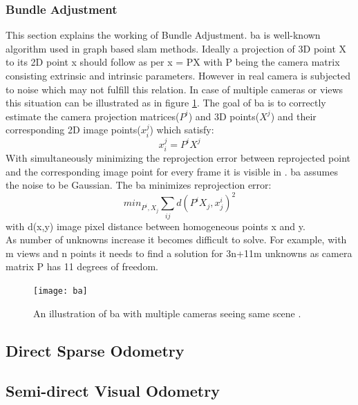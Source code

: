 \subsubsection{Bundle Adjustment}
This section explains the working of Bundle Adjustment. \acrshort{ba} is well-known algorithm used in graph based \acrshort{slam} methods. Ideally a projection of 3D point X to its 2D point x should follow as per x = PX with P being the camera matrix consisting extrinsic and intrinsic parameters. However in real camera is subjected to noise which may not fulfill this relation. In case of multiple cameras or views this situation can be illustrated as in figure \ref{fig:ba}. The goal of \acrshort{ba} is to correctly estimate the camera projection matrices($ P^{i}$) and 3D points($X^{j}$) and their corresponding 2D image points($ x_{i}^{j} $) which satisfy:
\begin{equation*}
 x_{i}^{j} = P^{i}X^{j}
\end{equation*} 
With simultaneously minimizing the reprojection error between reprojected point and the corresponding image point for every frame it is visible in \cite{multiview_geometry}. \acrshort{ba} assumes the noise to be Gaussian. The \acrshort{ba} minimizes reprojection error:
\begin{equation*}
 min_{P^{i},X_{j}} \sum_{ij} d(P^{i}X_{j},x_{j}^{i})^{2}
\end{equation*} 
with d(x,y) image pixel distance between homogeneous points x and y. \\
\newline 
As number of unknowns increase it becomes difficult to solve. For example, with m views and n points it needs to find a solution for 3n+11m unknowns as camera matrix P has 11 degrees of freedom.

\begin{figure}[h]
	\centering
	\texttt{[image: ba]}
	\caption{An illustration of \acrshort{ba} with multiple cameras seeing same scene \cite{sfm}.}
	\label{fig:ba}
\end{figure}

\subsection{Direct Sparse Odometry}

\subsection{Semi-direct Visual Odometry}




